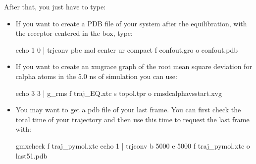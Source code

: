 \documentclass[letterpaper,10pt,english]{sphinxmanual}
\begin{document}
\sphinxAtStartPar
After that, you just have to type:

\begin{sphinxVerbatim}[commandchars=\\\{\}]
          
            
\end{sphinxVerbatim}
\begin{itemize}
\item {} 
\sphinxAtStartPar
If you want to create a PDB file of your system after the
equilibration, with the receptor centered in the box, type:

\sphinxAtStartPar
echo 1 0 | trjconv \sphinxhyphen{}pbc mol \sphinxhyphen{}center \sphinxhyphen{}ur compact \sphinxhyphen{}f confout.gro \sphinxhyphen{}o
confout.pdb

\item {} 
\sphinxAtStartPar
If you want to create an xmgrace graph of the root mean square
deviation for c\sphinxhyphen{}alpha atoms in the 5.0 ns of simulation you can use:

\sphinxAtStartPar
echo 3 3 | g\_rms \sphinxhyphen{}f traj\_EQ.xtc \sphinxhyphen{}s topol.tpr \sphinxhyphen{}o
rmsd\sphinxhyphen{}calpha\sphinxhyphen{}vs\sphinxhyphen{}start.xvg

\item {} 
\sphinxAtStartPar
You may want to get a pdb file of your last frame. You can first
check the total time of your trajectory and then use this time to
request the last frame with:

\sphinxAtStartPar
gmxcheck \sphinxhyphen{}f traj\_pymol.xtc echo 1 | trjconv \sphinxhyphen{}b 5000 \sphinxhyphen{}e 5000 \sphinxhyphen{}f
traj\_pymol.xtc \sphinxhyphen{}o last51.pdb

\end{itemize}
\end{document}
